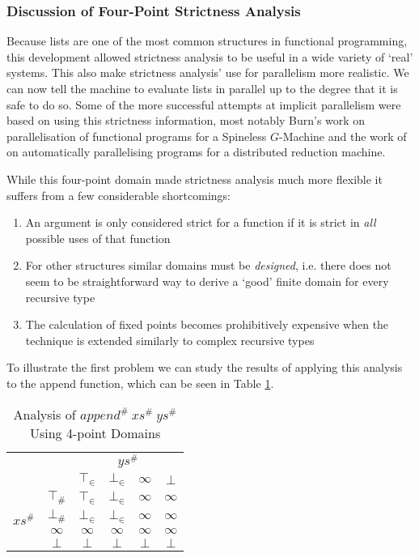 \subsubsection{Discussion of Four-Point Strictness Analysis}

Because lists are one of the most common structures in functional programming,
this development allowed strictness analysis to be useful in a wide variety of
`real' systems. This also make strictness analysis' use for parallelism more
realistic. We can now tell the machine to evaluate lists in parallel up to the
degree that it is safe to do so. Some of the more successful attempts at
implicit parallelism were based on using this strictness information, most
notably Burn's work on parallelisation of functional programs for a Spineless
$G$-Machine \citep{burn1987evaluation} and the work of
\citet{hogen1992automatic} on automatically parallelising programs for a
distributed reduction machine.

While this four-point domain made strictness analysis much more flexible it
suffers from a few considerable shortcomings:

\begin{enumerate}
    \item An argument is only considered strict for a function if it is strict
        in \emph{all} possible uses of that function
    \item For other structures similar domains must be \emph{designed}, i.e.
        there does not seem to be straightforward way to derive a `good' finite
        domain for every recursive type
    \item The calculation of fixed points becomes prohibitively expensive when
        the technique is extended similarly to complex recursive types
\end{enumerate}

To illustrate the first problem we can study the results of applying this
analysis to the \<append\> function, which can be seen in Table
\ref{tab:append}.

\begin{table}[h!]
\centering
\caption{Analysis of \(append^{\#}\ xs^{\#}\ ys^{\#}\) Using 4-point Domains}
\vspace{10pt}
\begin{tabular}{c c || c c c c}
                               & \multicolumn{1}{c}{} & \multicolumn{4}{c}{$ys^{\#}$}            \\
                               &             & $\top_{\in}$ & $\bot_{\in}$ & $\infty$ & $\bot$   \\
    \cline{2-6}
    \multirow{4}{*}{$xs^{\#}$} & $\top_{\#}$ & $\top_{\in}$ & $\bot_{\in}$ & $\infty$ & $\infty$ \\
                               & $\bot_{\#}$ & $\bot_{\in}$ & $\bot_{\in}$ & $\infty$ & $\infty$ \\
                               & $\infty$    & $\infty$     & $\infty$     & $\infty$ & $\infty$ \\
                               & $\bot$      & $\bot$       & $\bot$       & $\bot$   & $\bot$
\end{tabular}    
\label{tab:append}
\end{table}



